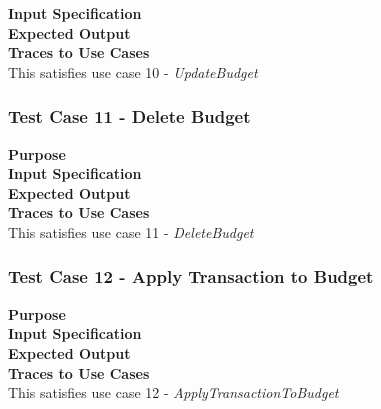 \documentclass[12pt]{article}
\begin{document}
\noindent
{\bf Input Specification}\\

\noindent
{\bf Expected Output}\\

\noindent
{\bf Traces to Use Cases}\\
This satisfies use case 10 - \textit{UpdateBudget}
\clearpage %


\subsubsection{Test Case 11 - Delete Budget} \label{TC-11}
\noindent
{\bf Purpose}\\
                                        
\noindent
{\bf Input Specification}\\

\noindent
{\bf Expected Output}\\

\noindent
{\bf Traces to Use Cases}\\
This satisfies use case 11 - \textit{DeleteBudget}


\subsubsection{Test Case 12 - Apply Transaction to Budget} \label{TC-12}
\noindent
{\bf Purpose}\\
                                                        
\noindent
{\bf Input Specification}\\

\noindent
{\bf Expected Output}\\

\noindent
{\bf Traces to Use Cases}\\
This satisfies use case 12 - \textit{ApplyTransactionToBudget}
\clearpage %

\end{document}
